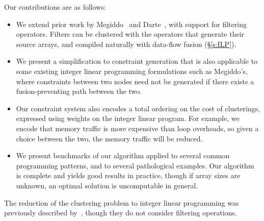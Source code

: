 Our contributions are as follows:
\begin{itemize}
\item   
We extend prior work by Megiddo~\cite{megiddo1998optimal} and Darte~\cite{darte2002contraction}, with support for filtering operators. Filters can be clustered with the operators that generate their source arrays, and compiled naturally with data-flow fusion (\S\ref{s:ILP}).

\item
We present a simplification to constraint generation that is also applicable to some existing integer linear programming formulations such as Megiddo's,
where constraints between two nodes need not be generated if there exists a fusion-preventing path between the two. 

\item
Our constraint system also encodes a total ordering on the cost of clusterings, expressed using weights on the integer linear program.
For example, we encode that memory traffic is more expensive than loop overheads, so given a choice between the two, the memory traffic will be reduced.

\item
We present benchmarks of our algorithm applied to several common programming patterns, and to several pathological examples.
Our algorithm is complete and yields good results in practice, though if array sizes are unknown, an optimal solution is uncomputable in general. 
\end{itemize}

The reduction of the clustering problem to integer linear programming was previously described by~\cite{megiddo1998optimal}, though they do not consider filtering operations.




